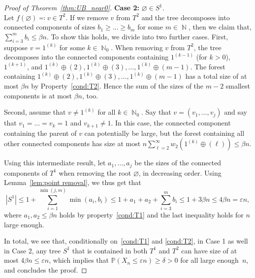 \documentclass[11pt]{article}
\numberwithin{equation}{section}
\DeclareMathOperator{\N}{\mathbb{N}} %
\newcommand{\p}{\mathbb{P}} %
\newcommand{\eps}{\varepsilon} %
\theoremstyle{definition}
\begin{document}
\begin{proof}[Proof of Theorem~\ref{thm:UB_near0}]
\textbf{Case 2:} $\varnothing \in S^1$.
\\ 
Let $f(\varnothing) \eqqcolon v \in T^2$. If we remove $v$ from  $T^2$ and the tree decomposes into connected components of sizes $b_1\geq\ldots\geq b_m$ for some $m \in \N$, then we claim that, $\sum_{i=3}^{m} b_i \leq \beta n$. To show this holds, we divide into two further cases. First, suppose  $v= 1^{(k)}$ for some $k\in\N_0$. When removing $v$ from $T^2$, the tree decomposes into the connected components containing $1^{(k-1)}$ (for $k>0$), $1^{(k+1)}$, and $1^{(k)}\oplus (2), 1^{(k)}\oplus(3),\ldots, 1^{(k)}\oplus(m-1)$. The forest containing $1^{(k)}\oplus (2), 1^{(k)}\oplus(3),\ldots, 1^{(k)}\oplus(m-1)$ has a total size of at most $\beta n$ by {Property}~\eqref{cond:T2}. Hence the sum of the sizes of the $m-2$ smallest components is at most   $\beta n$, too.

Second, assume that $v\neq 1^{(k)}$ for all $k \in \N_0$. Say that $v=(v_1,\ldots,v_j)$ and say that $v_1=\ldots=v_k=1$ and $v_{k+1} \neq 1$. In this case, the connected component containing the parent of $v$ can potentially be large, but the forest containing all other connected components has size at most $n\sum_{\ell=2}^{\infty} w_2(1^{(k)}\oplus(\ell)) \leq \beta n$.

Using this intermediate result, let $a_1,\ldots,a_j$ be the sizes of the connected components of $T^1$ when removing the root $\varnothing$, in decreasing order. Using Lemma~\ref{lem:point removal}, we thus get that
\begin{equation*}
    |S^1| \leq 1 + \sum_{i=1}^{\min(j,m)} \min(a_i,b_i) \leq 
    1+a_1+a_2+\sum_{i=3}^{m} b_i
    \leq 1 +3 \beta n \leq 4 \beta n=\eps n,
\end{equation*}
where $a_1,a_2\leq \beta n$ holds by property~\eqref{cond:T1} and the last inequality holds for $n$ large enough. 

In total, we see that, conditionally on~\eqref{cond:T1} and \eqref{cond:T2}, in Case 1 as well in Case 2, any tree $S^1$ that is contained in both $T^1$ and $T^2$ can have size of at most $4 \beta n \leq \eps n$, which implies that $\p(X_n \leq \eps n) \geq \delta > 0$ for all large enough~$n$, and concludes the proof.
\end{proof}
\end{document}
